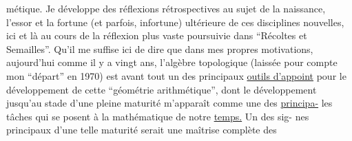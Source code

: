 métique. Je développe des réflexions rétrospectives au sujet de
la naissance, l'essor et la fortune (et parfois, infortune) ultérieure
de ces disciplines nouvelles, ici et là au cours de la réflexion plus
vaste poursuivie dans ``Récoltes et Semailles''. Qu'il me suffise ici de
dire que dans mes propres motivations, aujourd'hui comme il y a vingt
ans, l'algèbre topologique (laissée pour compte   mon ``départ''
en 1970) est avant tout un des principaux \uline{outils d'appoint} pour le
développement de cette ``géométrie arithmétique'', dont le développement
jusqu'au stade d'une pleine maturité m'apparaît comme une des \uline{principa-}%
les tâches qui se posent à la mathématique de notre \uline{temps.}\hand{]} Un des sig-%
nes principaux d'une telle maturité serait une maîtrise complète des

